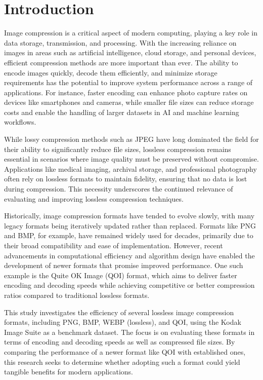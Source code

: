 \documentclass[conference]{IEEEtran}
\begin{document}
\section{Introduction}
Image compression is a critical aspect of modern computing, playing a key role in data storage, transmission, and processing. With the increasing reliance on images in areas such as artificial intelligence, cloud storage, and personal devices, efficient compression methods are more important than ever. The ability to encode images quickly, decode them efficiently, and minimize storage requirements has the potential to improve system performance across a range of applications. For instance, faster encoding can enhance photo capture rates on devices like smartphones and cameras, while smaller file sizes can reduce storage costs and enable the handling of larger datasets in AI and machine learning workflows.

While lossy compression methods such as JPEG have long dominated the field for their ability to significantly reduce file sizes, lossless compression remains essential in scenarios where image quality must be preserved without compromise. Applications like medical imaging, archival storage, and professional photography often rely on lossless formats to maintain fidelity, ensuring that no data is lost during compression. This necessity underscores the continued relevance of evaluating and improving lossless compression techniques.

Historically, image compression formats have tended to evolve slowly, with many legacy formats being iteratively updated rather than replaced. Formats like PNG and BMP, for example, have remained widely used for decades, primarily due to their broad compatibility and ease of implementation. However, recent advancements in computational efficiency and algorithm design have enabled the development of newer formats that promise improved performance. One such example is the Quite OK Image (QOI) format, which aims to deliver faster encoding and decoding speeds while achieving competitive or better compression ratios compared to traditional lossless formats.

This study investigates the efficiency of several lossless image compression formats, including PNG, BMP, WEBP (lossless), and QOI, using the Kodak Image Suite as a benchmark dataset. The focus is on evaluating these formats in terms of encoding and decoding speeds as well as compressed file sizes. By comparing the performance of a newer format like QOI with established ones, this research seeks to determine whether adopting such a format could yield tangible benefits for modern applications.
\end{document}
